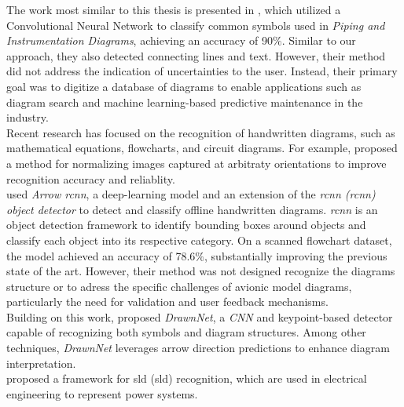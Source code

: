 The work most similar to this thesis is presented in \cite{fang_feng_cai_2022}, which utilized a Convolutional Neural Network to classify common symbols used in \textit{Piping and Instrumentation Diagrams}, achieving an accuracy of 90$\%$. Similar to our approach, they also detected connecting lines and text. However, their method did not address the indication of uncertainties to the user. Instead, their primary goal was to digitize a database of diagrams to enable applications such as diagram search and machine learning-based predictive maintenance in the industry.\\
Recent research has focused on the recognition of handwritten diagrams, such as mathematical equations, flowcharts, and circuit diagrams. For example, \cite{wei_phung_bouzerdoum_bermak_2015} proposed a method for normalizing images captured at arbitraty orientations to improve recognition accuracy and reliablity.\\
\cite{schaefer_keuper_stuckenschmidt_2021} used \textit{Arrow \acrshort{rcnn}}, a deep-learning model and an extension of the \textit{\acrlong{rcnn} (\acrshort{rcnn}) object detector} \cite{zhang2023dive} to detect and classify offline handwritten diagrams. \textit{\acrshort{rcnn}} is an object detection framework to identify bounding boxes around objects and classify each object into its respective category. On a scanned flowchart dataset, the model achieved an accuracy of 78.6$\%$, substantially improving the previous state of the art. However, their method was not designed recognize the diagrams structure or to adress the specific challenges of avionic model diagrams, particularly the need for validation and user feedback mechanisms.\\
Building on this work, \cite{fang_feng_cai_2022} proposed \textit{DrawnNet}, a \textit{CNN} and keypoint-based detector capable  of recognizing both symbols and diagram structures. Among other techniques, \textit{DrawnNet} leverages arrow direction predictions to enhance diagram interpretation.\\
\cite{yang_wang_zhang_li_wang_yang_shi_2024} proposed a framework for \acrlong{sld} (\acrshort{sld}) recognition, which are used in electrical engineering to represent power systems.

